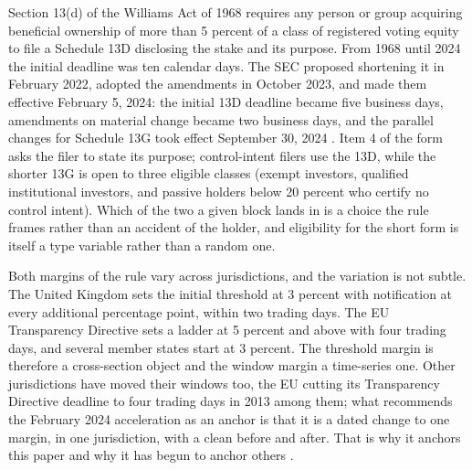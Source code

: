 \documentclass[11pt]{article}
\begin{document}
Section 13(d) of the Williams Act of 1968 requires any person or group acquiring beneficial
ownership of more than 5 percent of a class of registered voting equity to file a Schedule 13D
disclosing the stake and its purpose. From 1968 until 2024 the initial deadline was ten calendar
days. The SEC proposed shortening it in February 2022, adopted the amendments in October 2023, and
made them effective February 5, 2024: the initial 13D deadline became five business days, amendments
on material change became two business days, and the parallel changes for Schedule 13G took effect
September 30, 2024 \citep{SEC2022,SEC2023}. Item 4 of the form asks the filer to state its purpose;
control-intent filers use the 13D, while the shorter 13G is open to three eligible classes (exempt
investors, qualified institutional investors, and passive holders below 20 percent who certify no
control intent). Which of the two a given block lands in is a choice the rule frames rather than an
accident of the holder, and eligibility for the short form is itself a type variable rather than a
random one.

Both margins of the rule vary across jurisdictions, and the variation is not subtle. The United
Kingdom sets the initial threshold at 3 percent with notification at every additional percentage
point, within two trading days. The EU Transparency Directive sets a ladder at 5 percent and above
with four trading days, and several member states start at 3 percent. The threshold margin is
therefore a cross-section object and the window margin a time-series one. Other jurisdictions have
moved their windows too, the EU cutting its Transparency Directive deadline to four trading days in
2013 among them; what recommends the February 2024 acceleration as an anchor is that it is a dated
change to one margin, in one jurisdiction, with a clean before and after. That is why
it anchors this paper and why it has begun to anchor others \citep{PolkBuchheitRileyStone2024,
Trivedi2026}.
\end{document}
